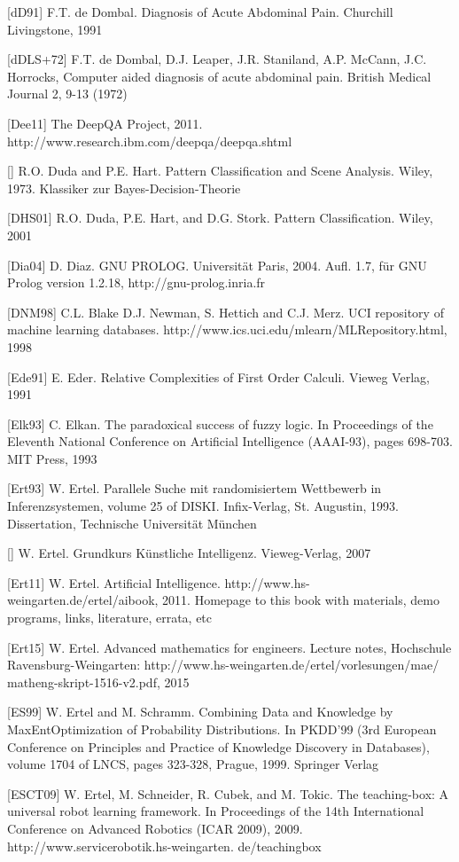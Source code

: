 \documentclass[10pt]{book}
\begin{document}
\begin{center}
[dD91] F.T. de Dombal. Diagnosis of Acute Abdominal Pain. Churchill Livingstone, 1991

[dDLS+72] F.T. de Dombal, D.J. Leaper, J.R. Staniland, A.P. McCann, J.C. Horrocks, Computer aided diagnosis of acute abdominal pain. British Medical Journal 2, 9-13 (1972)

[Dee11] The DeepQA Project, 2011. http://www.research.ibm.com/deepqa/deepqa.shtml

[\cite{dh73}] R.O. Duda and P.E. Hart. Pattern Classification and Scene Analysis. Wiley, 1973. Klassiker zur Bayes-Decision-Theorie

[DHS01] R.O. Duda, P.E. Hart, and D.G. Stork. Pattern Classification. Wiley, 2001

[Dia04] D. Diaz. GNU PROLOG. Universität Paris, 2004. Aufl. 1.7, für GNU Prolog version 1.2.18, http://gnu-prolog.inria.fr

[DNM98] C.L. Blake D.J. Newman, S. Hettich and C.J. Merz. UCI repository of machine learning databases. http://www.ics.uci.edu/mlearn/MLRepository.html, 1998

[Ede91] E. Eder. Relative Complexities of First Order Calculi. Vieweg Verlag, 1991

[Elk93] C. Elkan. The paradoxical success of fuzzy logic. In Proceedings of the Eleventh National Conference on Artificial Intelligence (AAAI-93), pages 698-703. MIT Press, 1993

[Ert93] W. Ertel. Parallele Suche mit randomisiertem Wettbewerb in Inferenzsystemen, volume 25 of DISKI. Infix-Verlag, St. Augustin, 1993. Dissertation, Technische Universität München

[\cite{ert07}] W. Ertel. Grundkurs Künstliche Intelligenz. Vieweg-Verlag, 2007

[Ert11] W. Ertel. Artificial Intelligence. http://www.hs-weingarten.de/ertel/aibook, 2011. Homepage to this book with materials, demo programs, links, literature, errata, etc

[Ert15] W. Ertel. Advanced mathematics for engineers. Lecture notes, Hochschule Ravensburg-Weingarten: http://www.hs-weingarten.de/ertel/vorlesungen/mae/ matheng-skript-1516-v2.pdf, 2015

[ES99] W. Ertel and M. Schramm. Combining Data and Knowledge by MaxEntOptimization of Probability Distributions. In PKDD'99 (3rd European Conference on Principles and Practice of Knowledge Discovery in Databases), volume 1704 of LNCS, pages 323-328, Prague, 1999. Springer Verlag

[ESCT09] W. Ertel, M. Schneider, R. Cubek, and M. Tokic. The teaching-box: A universal robot learning framework. In Proceedings of the 14th International Conference on Advanced Robotics (ICAR 2009), 2009. http://www.servicerobotik.hs-weingarten. de/teachingbox


\end{center}
\end{document}
